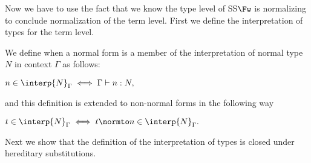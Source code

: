 Now we have to use the fact that we know the type level of SS$\Fw$ is
normalizing to conclude normalization of the term level.  First we
define the interpretation of types for the term level.

\begin{definition}
  \label{def:interpretation_of_types_stlc}
  We define when a normal form is a member of the interpretation of
  normal type $N$ in context $\Gamma$ as follows:
  \begin{center}
    \begin{math}
    n \in \interp{N}_\Gamma \iff \Gamma \vdash n:N,
  \end{math}
  \end{center}
  and this definition is extended to non-normal forms in the following way
  \begin{center}
    \begin{math}
      t \in \interp{N}_\Gamma \iff t \normto n \in \interp{N}_\Gamma.
  \end{math}
  \end{center}
\end{definition}

\noindent 
Next we show that the definition of the interpretation of types is closed under
hereditary substitutions.  

